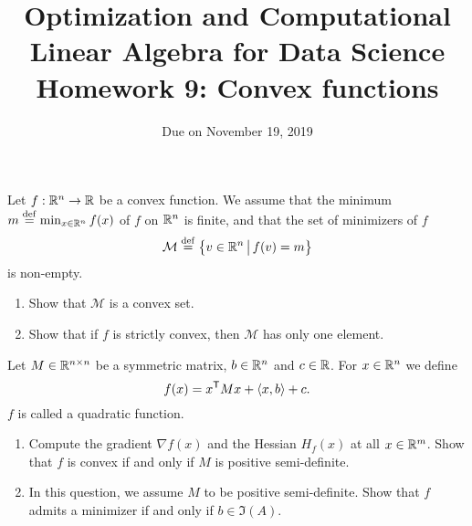 \documentclass[11pt,nocut]{article}
\title{\vspace{-2.0cm}%
	Optimization and Computational Linear Algebra for Data Science\\
Homework 9: Convex functions}
\date{\vspace{-1cm}Due on November 19, 2019}
\begin{document}
\maketitle



\vspace{4mm}

\begin{problem}[2 points]
	Let $f: \mathbb{R}^n \to \mathbb{R}$ be a convex function. We assume that the minimum $m \overset{\rm def}{=} \min_{x \in \mathbb{R}^n} f(x)$ of $f$ on $\mathbb{R}^n$ is finite, and that the set of minimizers of $f$
$$
\mathcal{M} \overset{\rm def}{=} \big\{ v \in \mathbb{R}^n \, \big| \, f(v) = m \big\}
$$
is non-empty.

	\begin{enumerate}[label=\normalfont(\textbf{\alph*})]
		\item Show that $\mathcal{M}$ is a convex set.
		\item Show that if $f$ is strictly convex, then $\mathcal{M}$ has only one element.
	\end{enumerate}

\end{problem}

\vspace{4mm}

\begin{problem}[2 points]
	Let $M \in \mathbb{R}^{n \times n}$ be a symmetric matrix, $b \in \mathbb{R}^n$ and $c \in \mathbb{R}$.
	For $x \in \mathbb{R}^n$ we define
	$$
	f(x) = x^{{\sf T}} M x + \langle x,b \rangle + c.
	$$
	$f$ is called a quadratic function.
	\begin{enumerate}[label=\normalfont(\textbf{\alph*})]
		\item Compute the gradient $\nabla f(x)$ and the Hessian $H_f(x)$ at all $x \in \mathbb{R}^m$. Show that $f$ is convex if and only if $M$ is positive semi-definite.
		\item In this question, we assume $M$ to be positive semi-definite. Show that $f$ admits a minimizer if and only if $b \in \Im(A)$.
	\end{enumerate}
\end{problem}

\newpage
\end{document}
